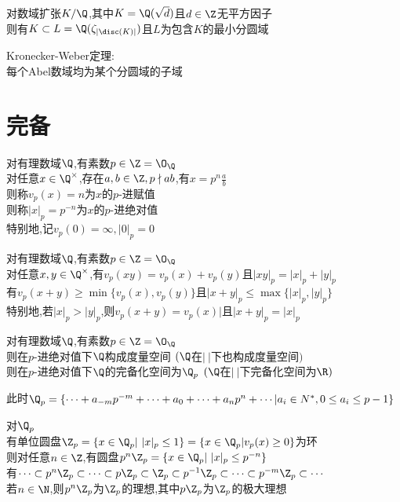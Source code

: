 \begin{dingli}
对数域扩张$K/\Q$,其中$K=\Q(\sqrt{d})$且$d\in \Z$无平方因子\\
则有$K\subset L=\Q(\zeta_{|\disc(K)|})$且$L$为包含$K$的最小分圆域
\end{dingli}

\begin{dingli}
Kronecker-Weber定理:\\
每个Abel数域均为某个分圆域的子域
\end{dingli}

\chapter{完备}

\begin{dingyi}
对有理数域$\Q$,有素数$p\in \Z=\O_{\Q}$\\
对任意$x\in \Q^{\times}$,存在$a,b\in \Z,p\nmid ab$,有$x=p^n\frac{a}{b}$\\
则称$v_p(x)=n$为$x$的$p$-进赋值\\
则称$|x|_p=p^{-n}$为$x$的$p$-进绝对值\\
特别地,记$v_p(0)=\infty,|0|_p=0$
\end{dingyi}

\begin{dingli}
对有理数域$\Q$,有素数$p\in \Z=\O_{\Q}$\\
对任意$x,y\in \Q^{\times}$,有$v_p(xy)=v_p(x)+v_p(y)$且$|xy|_p=|x|_p+|y|_p$\\
有$v_p(x+y)\geq \min\{v_p(x),v_p(y)\}$且$|x+y|_p\leq \max\{|x|_p,|y|_p\}$\\
特别地,若$|x|_p>|y|_p$,则$v_p(x+y)=v_p(x)|$且$|x+y|_p=|x|_p$
\end{dingli}

\begin{dingyi}
对有理数域$\Q$,有素数$p\in \Z=\O_{\Q}$\\
则在$p$-进绝对值下$\Q$构成度量空间$\ (\Q$在$|\ |$下也构成度量空间$)$\\
则在$p$-进绝对值下$\Q$的完备化空间为$\Q_p$$\ (\Q$在$|\ |$下完备化空间为$\R)$
\end{dingyi}

\begin{zhu}
此时$\Q_p=\{\cdots+a_{-m}p^{-m}+\cdots+a_0+\cdots+a_{n}p^{n}+\cdots|a_i\in N^*,0\leq a_i\leq p-1\}$
\end{zhu}

\begin{dingyi}
对$\Q_p$\\
有单位圆盘$\Z_p=\{x\in \Q_p|\ |x|_p\leq 1\}=\{x\in \Q_p|v_p(x)\geq 0\}$为环\\
则对任意$n\in \Z$,有圆盘$p^n\Z_p=\{x\in \Q_p|\ |x|_p\leq p^{-n}\}$\\
有$\cdots \subset p^n\Z_p \subset \cdots \subset p\Z_p \subset \Z_p \subset p^{-1}\Z_p \subset \cdots \subset p^{-m}\Z_p \subset \cdots$\\
若$n \in \N$,则$p^n\Z_p$为$\Z_p$的理想,其中$p\Z_p$为$\Z_p$的极大理想
\end{dingyi}

